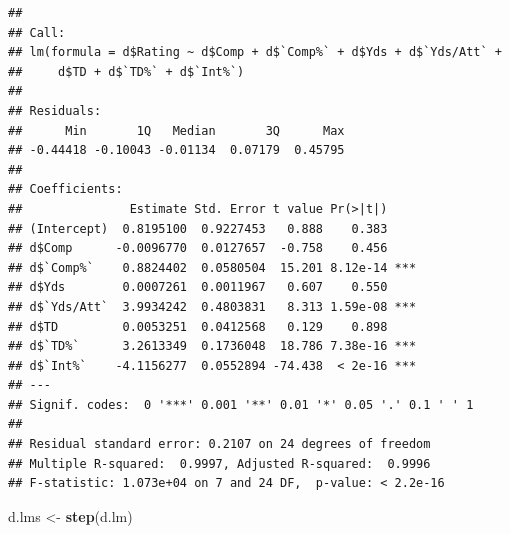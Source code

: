 \documentclass[]{ctexbook}
\newenvironment{Shaded}{\begin{snugshade}}{\end{snugshade}}
\newcommand{\KeywordTok}[1]{\textcolor[rgb]{0.13,0.29,0.53}{\textbf{#1}}}
\newcommand{\NormalTok}[1]{#1}
\newcommand{\StringTok}[1]{\textcolor[rgb]{0.31,0.60,0.02}{#1}}
\begin{document}
\begin{verbatim}
## 
## Call:
## lm(formula = d$Rating ~ d$Comp + d$`Comp%` + d$Yds + d$`Yds/Att` + 
##     d$TD + d$`TD%` + d$`Int%`)
## 
## Residuals:
##      Min       1Q   Median       3Q      Max 
## -0.44418 -0.10043 -0.01134  0.07179  0.45795 
## 
## Coefficients:
##               Estimate Std. Error t value Pr(>|t|)    
## (Intercept)  0.8195100  0.9227453   0.888    0.383    
## d$Comp      -0.0096770  0.0127657  -0.758    0.456    
## d$`Comp%`    0.8824402  0.0580504  15.201 8.12e-14 ***
## d$Yds        0.0007261  0.0011967   0.607    0.550    
## d$`Yds/Att`  3.9934242  0.4803831   8.313 1.59e-08 ***
## d$TD         0.0053251  0.0412568   0.129    0.898    
## d$`TD%`      3.2613349  0.1736048  18.786 7.38e-16 ***
## d$`Int%`    -4.1156277  0.0552894 -74.438  < 2e-16 ***
## ---
## Signif. codes:  0 '***' 0.001 '**' 0.01 '*' 0.05 '.' 0.1 ' ' 1
## 
## Residual standard error: 0.2107 on 24 degrees of freedom
## Multiple R-squared:  0.9997, Adjusted R-squared:  0.9996 
## F-statistic: 1.073e+04 on 7 and 24 DF,  p-value: < 2.2e-16
\end{verbatim}

\begin{Shaded}
\begin{Highlighting}[]
\NormalTok{d.lms <-}\StringTok{ }\KeywordTok{step}\NormalTok{(d.lm)}
\end{Highlighting}
\end{Shaded}
\end{document}
